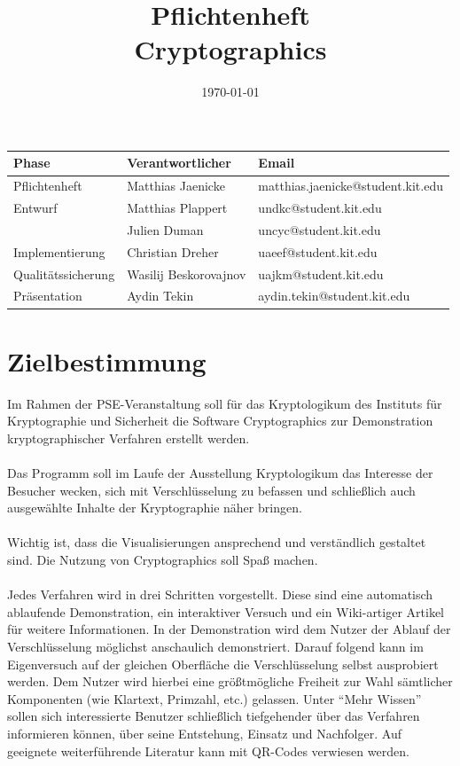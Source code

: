 \documentclass{article}
\title{\textbf{Pflichtenheft} \\ Cryptographics}
\author{}
\date{\today}
\begin{document}
\maketitle
\begin{table}[b]
  \begin{tabular}{| l | l | l |}
    \hline
    \textbf{Phase} & \textbf{Verantwortlicher} & \textbf{Email} \\ \hline
    Pflichtenheft & Matthias Jaenicke & matthias.jaenicke@student.kit.edu \\ \hline
    Entwurf & Matthias Plappert & undkc@student.kit.edu \\
            & Julien Duman & uncyc@student.kit.edu \\ \hline
    Implementierung & Christian Dreher & uaeef@student.kit.edu \\ \hline
    Qualitätssicherung & Wasilij Beskorovajnov & uajkm@student.kit.edu \\ \hline
    Präsentation & Aydin Tekin & aydin.tekin@student.kit.edu \\ \hline
    \end{tabular}
\end{table}
\newpage


\tableofcontents
\newpage

\section{Zielbestimmung}

Im Rahmen der \gls{PSE}-Veranstaltung soll für das \gls{Kryptologikum} des Instituts für
Kryptographie und Sicherheit die Software \gls{Cryptographics} zur
Demonstration kryptographischer Verfahren erstellt werden. \\
\\
Das Programm soll im Laufe der Ausstellung \gls{Kryptologikum} das Interesse der Besucher wecken, sich mit Verschlüsselung zu befassen und schließlich auch ausgewählte Inhalte der Kryptographie näher bringen. \\
\\
Wichtig ist, dass die Visualisierungen ansprechend und verständlich gestaltet sind. Die Nutzung von \gls{Cryptographics} soll Spaß machen. \\
\\
Jedes Verfahren wird in drei Schritten vorgestellt. Diese sind eine automatisch ablaufende Demonstration, ein interaktiver Versuch und ein Wiki-artiger Artikel für weitere Informationen.
In der Demonstration wird dem Nutzer der Ablauf der Verschlüsselung möglichst anschaulich demonstriert. Darauf folgend kann im Eigenversuch auf der gleichen Oberfläche die Verschlüsselung selbst ausprobiert werden. Dem Nutzer wird hierbei eine größtmögliche Freiheit zur Wahl sämtlicher Komponenten (wie Klartext, Primzahl, etc.) gelassen. Unter ``Mehr Wissen'' sollen sich interessierte Benutzer schließlich tiefgehender über das Verfahren informieren können, über seine Entstehung, Einsatz und Nachfolger. Auf geeignete weiterführende Literatur kann mit QR-Codes verwiesen werden. \\
\end{document}

